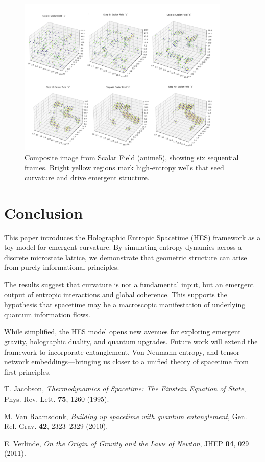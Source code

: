 \documentclass[12pt]{article}
\begin{document}
\begin{figure}[h]
    \centering
    \includegraphics[width=0.9\textwidth]{Figures/Figure_10.png}
    \caption{Composite image from Scalar Field (anime5), showing six sequential frames. Bright yellow regions mark high-entropy wells that seed curvature and drive emergent structure.}
    \label{fig:scalar_field}
\end{figure}



\section{Conclusion}

This paper introduces the Holographic Entropic Spacetime (HES) framework as a toy model for emergent curvature. By simulating entropy dynamics across a discrete microstate lattice, we demonstrate that geometric structure can arise from purely informational principles.

The results suggest that curvature is not a fundamental input, but an emergent output of entropic interactions and global coherence. This supports the hypothesis that spacetime may be a macroscopic manifestation of underlying quantum information flows.

While simplified, the HES model opens new avenues for exploring emergent gravity, holographic duality, and quantum upgrades. Future work will extend the framework to incorporate entanglement, Von Neumann entropy, and tensor network embeddings—bringing us closer to a unified theory of spacetime from first principles.



\begin{thebibliography}{9}

T. Jacobson, \textit{Thermodynamics of Spacetime: The Einstein Equation of State}, Phys. Rev. Lett. \textbf{75}, 1260 (1995).

M. Van Raamsdonk, \textit{Building up spacetime with quantum entanglement}, Gen. Rel. Grav. \textbf{42}, 2323–2329 (2010).

E. Verlinde, \textit{On the Origin of Gravity and the Laws of Newton}, JHEP \textbf{04}, 029 (2011).

\end{thebibliography}
\end{document}
